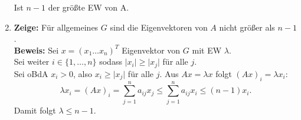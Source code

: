 \begin{solution}
\begin{enumerate}[label= (\alph*)]
    Ist \( n-1 \) der größte EW von A.
    \item \textbf{Zeige:} Für allgemeines \( G \) sind die Eigenvektoren von \( A \) nicht größer als \( n-1 \). \\
    \textbf{Beweis:} Sei \( x = {(x_1 \dots x_n)}^{T} \) Eigenvektor von \( G \) mit EW \( \lambda \). \\
    Sei weiter \( i \in \{ 1, \dots, n \} \) sodass \( \vert x_i \vert \geq \vert x_j \vert \) für alle \( j \). \\
    Sei oBdA \( x_i > 0 \), also \( x_i \geq \vert x_j \vert \) für alle \( j \).
    Aus \( Ax = \lambda x \) folgt \( {(Ax)}_i = \lambda x_i \):
    \begin{equation*}
      \lambda x_i = {(Ax)}_i = \sum_{j=1}^{n} a_{ij}x_j \leq \sum_{j=1}^{n} a_{ij}x_i \leq (n-1)x_i.
    \end{equation*}
    Damit folgt \( \lambda \leq n-1 \).
  \end{enumerate} 
\end{solution}

